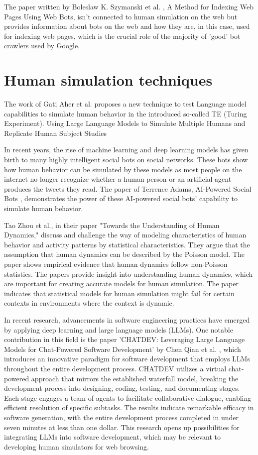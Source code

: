 The paper written by Boleslaw K. Szymanski et al. \cite{indexingweb}, A Method for Indexing Web Pages Using Web Bots, isn't connected to human simulation on the web but provides information about bots on the web and how they are, in this case, used for indexing web pages, which is the crucial role of the majority of 'good' bot crawlers used by Google. 

\section{Human simulation techniques}

The work of Gati Aher et al.\cite{aher2023using} proposes a new technique to test Language model capabilities to simulate human behavior in the introduced so-called TE (Turing Experiment). Using Large Language Models to Simulate Multiple Humans and Replicate Human Subject Studies 


In recent years, the rise of machine learning and deep learning models has given birth to many highly intelligent social bots on social networks. These bots show how human behavior can be simulated by these models as most people on the internet no longer recognize whether a human person or an artificial agent produces the tweets they read. The paper of Terrence Adams, AI-Powered Social Bots \cite{adams2017aipowered}, demonstrates the power of these AI-powered social bots' capability to simulate human behavior.


Tao Zhou et al., \cite{zhou2008understanding} in their paper "Towards the Understanding of Human Dynamics," discuss and challenge the way of modeling characteristics of human behavior and activity patterns by statistical characteristics. They argue that the assumption that human dynamics can be described by the Poisson model. The paper shows empirical evidence that human dynamics follow non-Poisson statistics. The papers provide insight into understanding human dynamics, which are important for creating accurate models for human simulation. The paper indicates that statistical models for human simulation might fail for certain contexts in environments where the context is dynamic. 


In recent research, advancements in software engineering practices have emerged by applying deep learning and large language models (LLMs). One notable contribution in this field is the paper 'CHATDEV: Leveraging Large Language Models for Chat-Powered Software Development' by Chen Qian et al. \cite{qian2023communicative}, which introduces an innovative paradigm for software development that employs LLMs throughout the entire development process. CHATDEV utilizes a virtual chat-powered approach that mirrors the established waterfall model, breaking the development process into designing, coding, testing, and documenting stages. Each stage engages a team of agents to facilitate collaborative dialogue, enabling efficient resolution of specific subtasks. The results indicate remarkable efficacy in software generation, with the entire development process completed in under seven minutes at less than one dollar. This research opens up possibilities for integrating LLMs into software development, which may be relevant to developing human simulators for web browsing.


